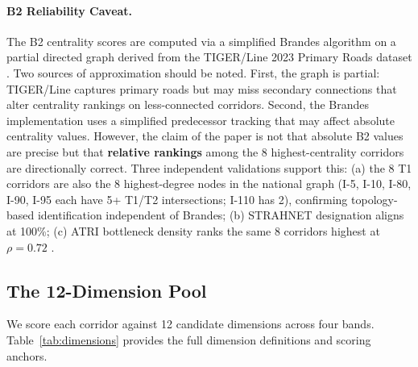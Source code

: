 \paragraph{B2 Reliability Caveat.}
The B2 centrality scores are computed via a simplified Brandes algorithm on a
partial directed graph derived from the TIGER/Line 2023 Primary Roads dataset
\citep{Census_TIGER2023}. Two sources of approximation should be noted. First, the
graph is partial: TIGER/Line captures primary roads but may miss secondary
connections that alter centrality rankings on less-connected corridors. Second,
the Brandes implementation uses a simplified predecessor tracking that may
affect absolute centrality values. However, the claim of the paper is not that
absolute B2 values are precise but that \textbf{relative rankings} among the 8
highest-centrality corridors are directionally correct. Three independent
validations support this: (a) the 8 T1 corridors are also the 8 highest-degree
nodes in the national graph (I-5, I-10, I-80, I-90, I-95 each have 5+ T1/T2
intersections; I-110 has 2), confirming topology-based identification independent
of Brandes; (b) STRAHNET designation aligns at 100\%; (c) ATRI bottleneck density
ranks the same 8 corridors highest at $\rho = 0.72$ \citep{ATRI_costs2024}.

\subsection{The 12-Dimension Pool}

We score each corridor against 12 candidate dimensions across four bands. Table~\ref{tab:dimensions} provides the full dimension definitions and scoring anchors.


